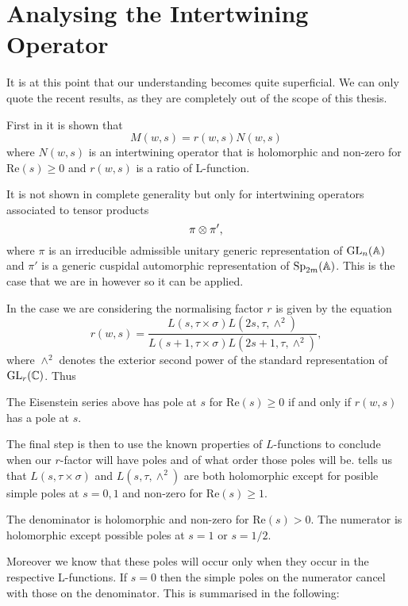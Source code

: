     \section{Analysing the Intertwining Operator}
    It is at this point that our understanding becomes quite superficial. We can only quote the recent results, as they are completely out of the scope of this thesis.
    
    First in \cite[11.1]{cogdellFunctorialityClassicalGroups2004} it is shown that 
    \[M(w, s) = r(w, s)N(w,s)\]
    where \(N(w,s)\) is an intertwining operator that is holomorphic and non-zero for \(\mathrm{Re}(s)\geq 0\) and \(r(w, s)\) is a ratio of L-function.
    \begin{remark}
    	It is not shown in complete generality but only for intertwining operators associated to tensor products
    	\[\pi\otimes \pi',\]
    	where \(\pi\) is an irreducible admissible unitary generic representation of \(\GL_n(\A)\) and \(\pi'\) is a generic cuspidal automorphic representation of \(\Sp_{2m}(\A)\). This is the case that we are in however so it can be applied. 
    \end{remark}
    
     In the case we are considering the normalising factor \(r\) is given by the equation \cite[4A]{jiangPolesCertainResidual2013}
     \[r(w, s) = \frac{L(s, \tau\times \sigma)L(2s, \tau,\wedge^2)}{L(s+1, \tau\times \sigma)L(2s+1, \tau, \wedge^2)},\]
    where \(\wedge^2\) denotes the exterior second power of the standard representation of \(\GL_r(\C)\). Thus

     \begin{Lemma}
        The Eisenstein series above has pole at \(s\) for \(\mathrm{Re}(s)\geq 0\) if and only if \(r(w,s)\) has a pole at \(s\).
     \end{Lemma}
     The final step is then to use the known properties of \(L\)-functions to conclude when our \(r\)-factor will have poles and of what order those poles will be. \cite{jiangPolesCertainResidual2013} tells us that \(L(s, \tau\times \sigma)\) and \(L(s, \tau, \wedge^2)\) are both holomorphic except for posible simple poles at \(s=0, 1\) and non-zero for \(\mathrm{Re}(s)\geq 1\). 
     
     The denominator is holomorphic and non-zero for \(\mathrm{Re}(s)>0\).
	 The numerator is holomorphic except possible poles at \(s= 1\) or \(s=1/2\). 
	 
	 Moreover we know that these poles will occur only when they occur in the respective L-functions. If \(s=0\) then the simple poles on the numerator cancel with those on the denominator. This is summarised in the following:

    \begin{Theorem}
        
    \end{Theorem}

    

     